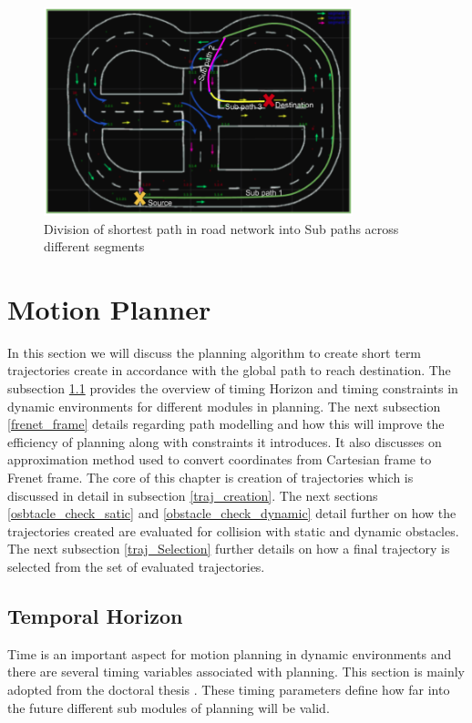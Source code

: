 \begin{figure}[H]
    \centering
    \includegraphics[width=0.8\textwidth]{Images/path_Segmentation.png}
    \caption{Division of shortest path in road network into Sub paths across different segments}
    \label{path_Segmentation}
\end{figure}

\section{Motion Planner} \label{motion_planner}

In this section we will discuss the planning algorithm to create short term trajectories create in accordance with the global path to reach destination. The subsection \ref{timing_constraints} provides the overview of timing Horizon and timing constraints in dynamic environments for different modules in planning. The next subsection \ref{frenet_frame} details regarding path modelling and how this will improve the efficiency of planning along with constraints it introduces. It also discusses on approximation method used to convert coordinates from Cartesian frame to Frenet frame. The core of this chapter is creation of trajectories which is discussed in detail in subsection \ref{traj_creation}. The next sections \ref{osbtacle_check_satic} and \ref{obstacle_check_dynamic} detail further on how the trajectories created are evaluated for collision with static and dynamic obstacles. The next subsection \ref{traj_Selection} further details on how a final trajectory is selected from the set of evaluated trajectories. 

\subsection{Temporal Horizon} \label{timing_constraints}
Time is an important aspect for motion planning in dynamic environments and there are several timing variables associated with planning. This section is mainly adopted from the doctoral thesis \cite{eth_timing_constraints}. These timing parameters define how far into the future different sub modules of planning will be valid. 

